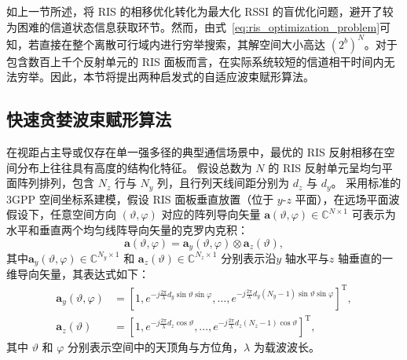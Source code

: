 如上一节所述，将 RIS 的相移优化转化为最大化 RSSI 的盲优化问题，避开了较为困难的信道状态信息获取环节。然而，由式~\eqref{eq:ris_optimization_problem}可知，若直接在整个离散可行域内进行穷举搜索，其解空间大小高达 $(2^b)^N$。对于包含数百上千个反射单元的 RIS 面板而言，在实际系统较短的信道相干时间内无法穷举。因此，本节将提出两种启发式的自适应波束赋形算法。


\subsection{快速贪婪波束赋形算法}


在视距占主导或仅存在单一强多径的典型通信场景中，最优的 RIS 反射相移在空间分布上往往具有高度的结构化特征。
假设总数为 $N$ 的 RIS 反射单元呈均匀平面阵列排列，包含 $N_z$ 行与 $N_y$ 列，且行列天线间距分别为 $d_z$ 与 $d_y$。
采用标准的 3GPP 空间坐标系建模，假设 RIS 面板垂直放置（位于 $y$-$z$ 平面），在远场平面波假设下，任意空间方向 $(\vartheta, \varphi)$ 对应的阵列导向矢量 $\bm{a}(\vartheta, \varphi) \in \mathbb{C}^{N \times 1}$ 可表示为水平和垂直两个均匀线阵导向矢量的克罗内克积：
\begin{equation}
	\bm{a}(\vartheta, \varphi) = \bm{a}_y(\vartheta, \varphi) \otimes \bm{a}_z(\vartheta),
\end{equation}
其中$\bm{a}_y(\vartheta, \varphi) \in \mathbb{C}^{N_y \times 1}$ 和 $\bm{a}_z(\vartheta) \in \mathbb{C}^{N_z \times 1}$ 分别表示沿$y$ 轴水平与$z$ 轴垂直的一维导向矢量，其表达式如下：
\begin{align}
	\bm{a}_y(\vartheta, \varphi) &= \left[ 1, e^{-j\frac{2\pi}{\lambda} d_y \sin\vartheta \sin\varphi}, \dots, e^{-j\frac{2\pi}{\lambda} d_y (N_y-1) \sin\vartheta \sin\varphi} \right]^\mathrm{T}, \\
	\bm{a}_z(\vartheta) &= \left[ 1, e^{-j\frac{2\pi}{\lambda} d_z \cos\vartheta}, \dots, e^{-j\frac{2\pi}{\lambda} d_z (N_z-1) \cos\vartheta} \right]^\mathrm{T},
\end{align}
其中 $\vartheta$ 和 $\varphi$ 分别表示空间中的天顶角与方位角，$\lambda$ 为载波波长。

